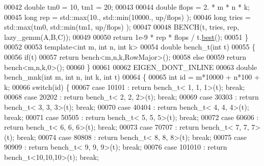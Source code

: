 \begin{DoxyCode}
00042   \textcolor{keywordtype}{double} tm0 = 10, tm1 = 20;
00043 
00044   \textcolor{keywordtype}{double} flops = 2. * m * n * k;
00045   \textcolor{keywordtype}{long} rep = std::max(10., std::min(10000., up/flops) );
00046   \textcolor{keywordtype}{long} tries = std::max(tm0, std::min(tm1, up/flops) );
00047 
00048   BENCH(t, tries, rep, lazy\_gemm(A,B,C));
00049 
00050   \textcolor{keywordflow}{return} 1e-9 * rep * flops / t.\hyperlink{class_eigen_1_1_bench_timer_ae8b673b0fa356d3432c7a65c79e8af0e}{best}();
00051 \}
00052 
00053 \textcolor{keyword}{template}<\textcolor{keywordtype}{int} m, \textcolor{keywordtype}{int} n, \textcolor{keywordtype}{int} k>
00054 \textcolor{keywordtype}{double} bench\_t(\textcolor{keywordtype}{int} t)
00055 \{
00056   \textcolor{keywordflow}{if}(t)
00057     \textcolor{keywordflow}{return} bench<m,n,k,RowMajor>();
00058   \textcolor{keywordflow}{else}
00059     \textcolor{keywordflow}{return} bench<m,n,k,0>();
00060 \}
00061 
00062 EIGEN\_DONT\_INLINE
00063 \textcolor{keywordtype}{double} bench\_mnk(\textcolor{keywordtype}{int} m, \textcolor{keywordtype}{int} n, \textcolor{keywordtype}{int} k, \textcolor{keywordtype}{int} t)
00064 \{
00065   \textcolor{keywordtype}{int} \textcolor{keywordtype}{id} = m*10000 + n*100 + k;
00066   \textcolor{keywordflow}{switch}(\textcolor{keywordtype}{id}) \{
00067     \textcolor{keywordflow}{case}  10101 : \textcolor{keywordflow}{return} bench\_t< 1, 1, 1>(t); \textcolor{keywordflow}{break};
00068     \textcolor{keywordflow}{case}  20202 : \textcolor{keywordflow}{return} bench\_t< 2, 2, 2>(t); \textcolor{keywordflow}{break};
00069     \textcolor{keywordflow}{case}  30303 : \textcolor{keywordflow}{return} bench\_t< 3, 3, 3>(t); \textcolor{keywordflow}{break};
00070     \textcolor{keywordflow}{case}  40404 : \textcolor{keywordflow}{return} bench\_t< 4, 4, 4>(t); \textcolor{keywordflow}{break};
00071     \textcolor{keywordflow}{case}  50505 : \textcolor{keywordflow}{return} bench\_t< 5, 5, 5>(t); \textcolor{keywordflow}{break};
00072     \textcolor{keywordflow}{case}  60606 : \textcolor{keywordflow}{return} bench\_t< 6, 6, 6>(t); \textcolor{keywordflow}{break};
00073     \textcolor{keywordflow}{case}  70707 : \textcolor{keywordflow}{return} bench\_t< 7, 7, 7>(t); \textcolor{keywordflow}{break};
00074     \textcolor{keywordflow}{case}  80808 : \textcolor{keywordflow}{return} bench\_t< 8, 8, 8>(t); \textcolor{keywordflow}{break};
00075     \textcolor{keywordflow}{case}  90909 : \textcolor{keywordflow}{return} bench\_t< 9, 9, 9>(t); \textcolor{keywordflow}{break};
00076     \textcolor{keywordflow}{case} 101010 : \textcolor{keywordflow}{return} bench\_t<10,10,10>(t); \textcolor{keywordflow}{break};

\end{DoxyCode}

